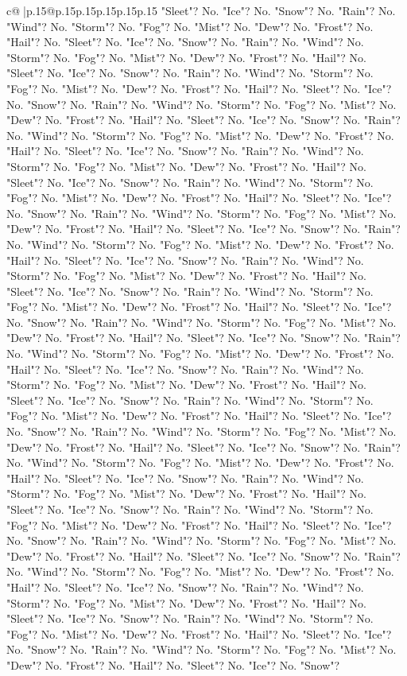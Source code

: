 \documentclass{article}
\begin{document}
{\begin{supertabular}{c@{$\;$}|p{.15\linewidth}@{}p{.15\linewidth}p{.15\linewidth}p{.15\linewidth}p{.15\linewidth}p{.15\linewidth}}
{{{"Sleet"? No. "Ice"? No. "Snow"? No. "Rain"? No. "Wind"? No. "Storm"? No. "Fog"? No. "Mist"? No. "Dew"? No. "Frost"? No. "Hail"? No. "Sleet"? No. "Ice"? No. "Snow"? No. "Rain"? No. "Wind"? No. "Storm"? No. "Fog"? No. "Mist"? No. "Dew"? No. "Frost"? No. "Hail"? No. "Sleet"? No. "Ice"? No. "Snow"? No. "Rain"? No. "Wind"? No. "Storm"? No. "Fog"? No. "Mist"? No. "Dew"? No. "Frost"? No. "Hail"? No. "Sleet"? No. "Ice"? No. "Snow"? No. "Rain"? No. "Wind"? No. "Storm"? No. "Fog"? No. "Mist"? No. "Dew"? No. "Frost"? No. "Hail"? No. "Sleet"? No. "Ice"? No. "Snow"? No. "Rain"? No. "Wind"? No. "Storm"? No. "Fog"? No. "Mist"? No. "Dew"? No. "Frost"? No. "Hail"? No. "Sleet"? No. "Ice"? No. "Snow"? No. "Rain"? No. "Wind"? No. "Storm"? No. "Fog"? No. "Mist"? No. "Dew"? No. "Frost"? No. "Hail"? No. "Sleet"? No. "Ice"? No. "Snow"? No. "Rain"? No. "Wind"? No. "Storm"? No. "Fog"? No. "Mist"? No. "Dew"? No. "Frost"? No. "Hail"? No. "Sleet"? No. "Ice"? No. "Snow"? No. "Rain"? No. "Wind"? No. "Storm"? No. "Fog"? No. "Mist"? No. "Dew"? No. "Frost"? No. "Hail"? No. "Sleet"? No. "Ice"? No. "Snow"? No. "Rain"? No. "Wind"? No. "Storm"? No. "Fog"? No. "Mist"? No. "Dew"? No. "Frost"? No. "Hail"? No. "Sleet"? No. "Ice"? No. "Snow"? No. "Rain"? No. "Wind"? No. "Storm"? No. "Fog"? No. "Mist"? No. "Dew"? No. "Frost"? No. "Hail"? No. "Sleet"? No. "Ice"? No. "Snow"? No. "Rain"? No. "Wind"? No. "Storm"? No. "Fog"? No. "Mist"? No. "Dew"? No. "Frost"? No. "Hail"? No. "Sleet"? No. "Ice"? No. "Snow"? No. "Rain"? No. "Wind"? No. "Storm"? No. "Fog"? No. "Mist"? No. "Dew"? No. "Frost"? No. "Hail"? No. "Sleet"? No. "Ice"? No. "Snow"? No. "Rain"? No. "Wind"? No. "Storm"? No. "Fog"? No. "Mist"? No. "Dew"? No. "Frost"? No. "Hail"? No. "Sleet"? No. "Ice"? No. "Snow"? No. "Rain"? No. "Wind"? No. "Storm"? No. "Fog"? No. "Mist"? No. "Dew"? No. "Frost"? No. "Hail"? No. "Sleet"? No. "Ice"? No. "Snow"? No. "Rain"? No. "Wind"? No. "Storm"? No. "Fog"? No. "Mist"? No. "Dew"? No. "Frost"? No. "Hail"? No. "Sleet"? No. "Ice"? No. "Snow"? No. "Rain"? No. "Wind"? No. "Storm"? No. "Fog"? No. "Mist"? No. "Dew"? No. "Frost"? No. "Hail"? No. "Sleet"? No. "Ice"? No. "Snow"? No. "Rain"? No. "Wind"? No. "Storm"? No. "Fog"? No. "Mist"? No. "Dew"? No. "Frost"? No. "Hail"? No. "Sleet"? No. "Ice"? No. "Snow"? No. "Rain"? No. "Wind"? No. "Storm"? No. "Fog"? No. "Mist"? No. "Dew"? No. "Frost"? No. "Hail"? No. "Sleet"? No. "Ice"? No. "Snow"? No. "Rain"? No. "Wind"? No. "Storm"? No. "Fog"? No. "Mist"? No. "Dew"? No. "Frost"? No. "Hail"? No. "Sleet"? No. "Ice"? No. "Snow"? No. "Rain"? No. "Wind"? No. "Storm"? No. "Fog"? No. "Mist"? No. "Dew"? No. "Frost"? No. "Hail"? No. "Sleet"? No. "Ice"? No. "Snow"? No. "Rain"? No. "Wind"? No. "Storm"? No. "Fog"? No. "Mist"? No. "Dew"? No. "Frost"? No. "Hail"? No. "Sleet"? No. "Ice"? No. "Snow"? No. "Rain"? No. "Wind"? No. "Storm"? No. "Fog"? No. "Mist"? No. "Dew"? No. "Frost"? No. "Hail"? No. "Sleet"? No. "Ice"? No. "Snow"? No. "Rain"? No. "Wind"? No. "Storm"? No. "Fog"? No. "Mist"? No. "Dew"? No. "Frost"? No. "Hail"? No. "Sleet"? No. "Ice"? No. "Snow"? No. "Rain"? No. "Wind"? No. "Storm"? No. "Fog"? No. "Mist"? No. "Dew"? No. "Frost"? No. "Hail"? No. "Sleet"? No. "Ice"? No. "Snow"? }}}
\end{supertabular}}
\end{document}
